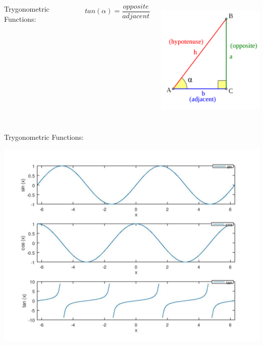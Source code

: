 \documentclass[]{beamer}
\begin{document}
  \begin{frame}

   \begin{columns}[c]
      \column{2in}  %
      Trygonometric Functions:
   

   
   \begin{equation*}
   tan(\alpha) =\frac{opposite}{adjacent}
   \end{equation*}
   

   
     
      \column{2.5in}
   
   
   
   
     \begin{center}
     \includegraphics[height=2.3in]{images/triangle.png}
   \end{center}
   
   
      \end{columns}

 \end{frame}



\begin{frame}



   Trygonometric Functions:

   \begin{center}
      \includegraphics[height=3.in]{images/trigonometric.jpg}
    \end{center}
    

 \end{frame}
\end{document}
